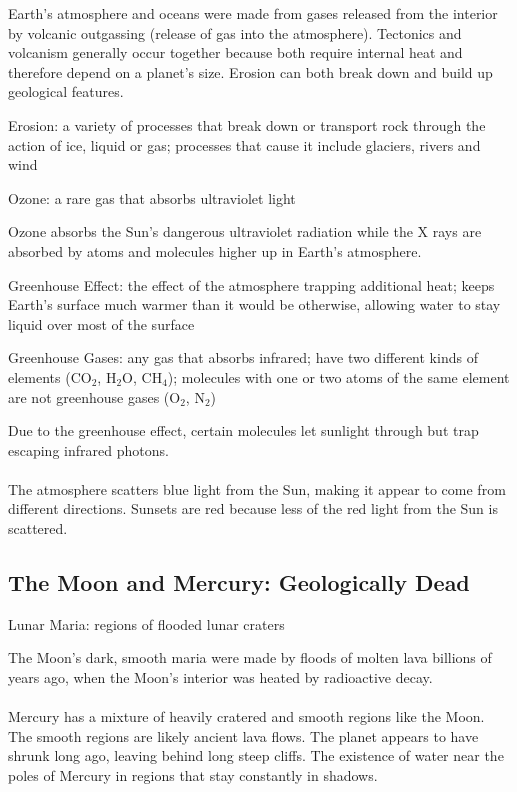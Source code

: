 \documentclass[12pt]{article}
\begin{document}
Earth's atmosphere and oceans were made from gases released from the interior by volcanic outgassing (release of gas into the atmosphere). Tectonics and volcanism generally occur together because both require internal heat and therefore depend on a planet's size. Erosion can both break down and build up geological features. 
\begin{definition} Erosion: a variety of processes that break down or transport rock through the action of ice, liquid or gas; processes that cause it include glaciers, rivers and wind \end{definition} 
\begin{definition} Ozone: a rare gas that absorbs ultraviolet light \end{definition} 
Ozone absorbs the Sun's dangerous ultraviolet radiation while the X rays are absorbed by atoms and molecules higher up in Earth's atmosphere. 
\begin{definition} Greenhouse Effect: the effect of the atmosphere trapping additional heat; keeps Earth's surface much warmer than it would be otherwise, allowing water to stay liquid over most of the surface \end{definition} 
\begin{definition} Greenhouse Gases: any gas that absorbs infrared; have two different kinds of elements (CO$_2$, H$_2$O, CH$_4$); molecules with one or two atoms of the same element are not greenhouse gases (O$_2$, N$_2$)  \end{definition} 
Due to the greenhouse effect, certain molecules let sunlight through but trap escaping infrared photons. \\~\\
The atmosphere scatters blue light from the Sun, making it appear to come from different directions. Sunsets are red because less of the red light from the Sun is scattered. 

\subsection{The Moon and Mercury: Geologically Dead} 
\begin{definition} Lunar Maria: regions of flooded lunar craters \end{definition}
The Moon's dark, smooth maria were made by floods of molten lava billions of years ago, when the Moon's interior was heated by radioactive decay. \\~\\
Mercury has a mixture of heavily cratered and smooth regions like the Moon. The smooth regions are likely ancient lava flows. The planet appears to have shrunk long ago, leaving behind long steep cliffs. The existence of water near the poles of Mercury in regions that stay constantly in shadows. 
\end{document}
